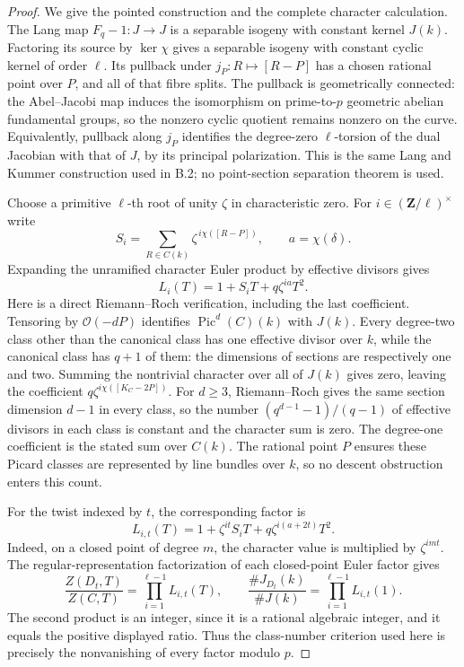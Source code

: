 \begin{proof}
We give the pointed construction and the complete character calculation.
The Lang map $F_q-1:J\to J$ is a separable isogeny with
constant kernel $J(k)$.
Factoring its source by $\ker\chi$ gives a separable isogeny
with constant cyclic kernel of order $\ell$.
Its pullback under $j_P:R\mapsto[R-P]$ has a chosen rational
point over $P$, and all of that fibre splits.
The pullback is geometrically connected: the Abel--Jacobi map
induces the isomorphism on prime-to-$p$ geometric abelian
fundamental groups, so the nonzero cyclic quotient remains
nonzero on the curve.  Equivalently, pullback along $j_P$
identifies the degree-zero $\ell$-torsion of the dual Jacobian
with that of $J$, by its principal polarization.
This is the same Lang and Kummer construction used in B.2;
no point-section separation theorem is used.

Choose a primitive $\ell$-th root of unity $\zeta$ in characteristic
zero.  For $i\in(\mathbf Z/\ell)^\times$ write
\[
       S_i=\sum_{R\in C(k)}\zeta^{\,i\chi([R-P])},
                     \qquad a=\chi(\delta).
\]
Expanding the unramified character Euler product by effective
divisors gives
\[
                        L_i(T)=1+S_iT+q\zeta^{ia}T^2.
                                                            \tag{B.141.3}
\]
Here is a direct Riemann--Roch verification, including the last
coefficient.  Tensoring by $\mathcal O(-dP)$ identifies
$\operatorname{Pic}^d(C)(k)$ with $J(k)$.
Every degree-two class other than the canonical class has one
effective divisor over $k$, while the canonical class has
$q+1$ of them: the dimensions of sections are respectively
one and two.  Summing the nontrivial character over all of
$J(k)$ gives zero, leaving the coefficient
$q\zeta^{i\chi([K_C-2P])}$.
For $d\ge3$, Riemann--Roch gives the same section dimension
$d-1$ in every class, so the number
$(q^{d-1}-1)/(q-1)$ of effective divisors in each class is
constant and the character sum is zero.
The degree-one coefficient is the stated sum over $C(k)$.
The rational point $P$ ensures these Picard classes are represented
by line bundles over $k$, so no descent obstruction enters this count.

For the twist indexed by $t$, the corresponding factor is
\[
              L_{i,t}(T)=
       1+\zeta^{it}S_iT+q\zeta^{i(a+2t)}T^2.
                                                            \tag{B.141.4}
\]
Indeed, on a closed point of degree $m$, the character value
is multiplied by $\zeta^{imt}$.
The regular-representation factorization of each closed-point
Euler factor gives
\[
 \frac{Z(D_t,T)}{Z(C,T)}
       =\prod_{i=1}^{\ell-1}L_{i,t}(T),\qquad
 \frac{\#J_{D_t}(k)}{\#J(k)}
       =\prod_{i=1}^{\ell-1}L_{i,t}(1).
                                                            \tag{B.141.5}
\]
The second product is an integer, since it is a rational algebraic
integer, and it equals the positive displayed ratio.
Thus the class-number criterion used here is precisely the
nonvanishing of every factor modulo $p$.


\end{proof}
